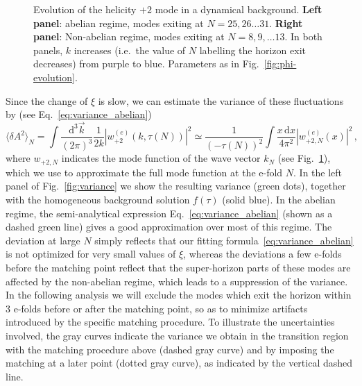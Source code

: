 \begin{figure}[t]
\hfill
{}
\caption{Evolution of the helicity $+2$ mode in a dynamical background. \textbf{Left panel}: abelian regime, modes exiting at $N = 25,26\dots 31$. \textbf{Right panel}: Non-abelian regime, modes exiting at $N = 8,9,\dots 13$. In both panels, $k$ increases (i.e.\ the value of $N$ labelling the horizon exit decreases) from purple to blue. Parameters as in Fig.~\ref{fig:phi-evolution}.}
  \label{fig:modes-evolution}
\end{figure}


Since the change of $\xi$ is slow, we can estimate the variance of these fluctuations by {(see Eq.~\eqref{eq:variance_abelian})}
{ \begin{equation}
 \langle \delta A^2 \rangle_N = \int \frac{\textrm{d}^3 \vec{k}}{(2 \pi)^3 } \frac{1}{2 k} | w_{+2}^{(e)}\left(k, 
 \tau(N) \right) |^2  \simeq \frac{1}{\left(- \tau(N)\right)^2} \int \frac{x \,  \textrm{d}x}{4 \pi^2} | w_{+2,N}^{(e)}(x) |^2 \,,
 \label{eq:estimate-variance}
\end{equation} 
where $w_{+2,N}$ indicates the mode function of the wave vector $k_N$ (see Fig.~\ref{fig:modes-evolution}), which we use to approximate the full mode function at the e-fold $N$. } In the left panel of Fig.~\ref{fig:variance} we show the resulting variance (green dots), together with the homogeneous background solution $f(\tau)$ (solid blue). In the abelian regime, the semi-analytical expression Eq.~\eqref{eq:variance_abelian} (shown as a dashed green line) gives a good approximation over most of this regime. {The deviation at large $N$ simply reflects that our fitting formula~\eqref{eq:variance_abelian} is not optimized for very small values of $\xi$,} 
whereas the deviations a few e-folds before the matching point reflect that the super-horizon parts of these modes are affected by the non-abelian regime, which leads to a suppression of the variance. In the following analysis we will exclude the modes which exit the horizon within 3 e-folds before or after the matching point, so as to minimize artifacts introduced by the specific matching procedure. To illustrate the uncertainties involved, the gray curves indicate the variance we obtain in the transition region with the matching procedure above (dashed gray curve) and by imposing the matching at a later point (dotted gray curve), as indicated by the vertical dashed line.


